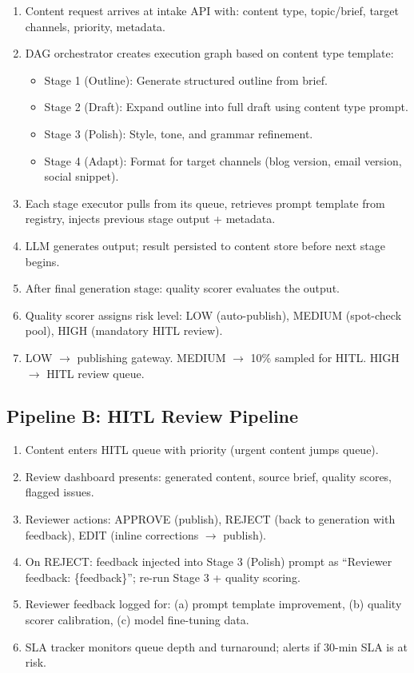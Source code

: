\begin{enumerate}
  \item Content request arrives at intake API with: content type, topic/brief, target channels, priority, metadata.
  \item DAG orchestrator creates execution graph based on content type template:
    \begin{itemize}
      \item Stage 1 (Outline): Generate structured outline from brief.
      \item Stage 2 (Draft): Expand outline into full draft using content type prompt.
      \item Stage 3 (Polish): Style, tone, and grammar refinement.
      \item Stage 4 (Adapt): Format for target channels (blog version, email version, social snippet).
    \end{itemize}
  \item Each stage executor pulls from its queue, retrieves prompt template from registry, injects previous stage output + metadata.
  \item LLM generates output; result persisted to content store before next stage begins.
  \item After final generation stage: quality scorer evaluates the output.
  \item Quality scorer assigns risk level: LOW (auto-publish), MEDIUM (spot-check pool), HIGH (mandatory HITL review).
  \item LOW $\rightarrow$ publishing gateway. MEDIUM $\rightarrow$ 10\% sampled for HITL. HIGH $\rightarrow$ HITL review queue.
\end{enumerate}

\subsection*{Pipeline B: HITL Review Pipeline}

\begin{enumerate}
  \item Content enters HITL queue with priority (urgent content jumps queue).
  \item Review dashboard presents: generated content, source brief, quality scores, flagged issues.
  \item Reviewer actions: APPROVE (publish), REJECT (back to generation with feedback), EDIT (inline corrections $\rightarrow$ publish).
  \item On REJECT: feedback injected into Stage 3 (Polish) prompt as ``Reviewer feedback: \{feedback\}''; re-run Stage 3 + quality scoring.
  \item Reviewer feedback logged for: (a) prompt template improvement, (b) quality scorer calibration, (c) model fine-tuning data.
  \item SLA tracker monitors queue depth and turnaround; alerts if 30-min SLA is at risk.
\end{enumerate}

